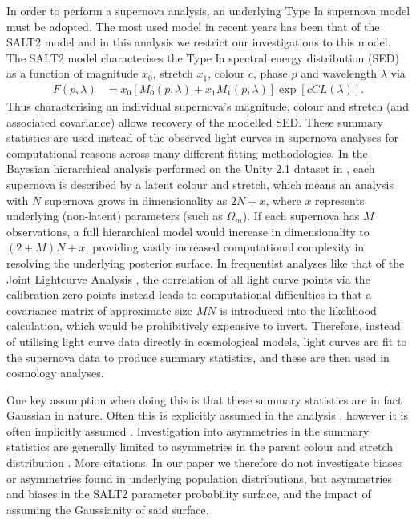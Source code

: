\documentclass[a4paper,fleqn,usenatbib]{mnras}
\newcommand{\red}{\color{red}}
\begin{document}
In order to perform a supernova analysis, an underlying Type Ia supernova model must be adopted. The most used model in recent years has been that of the SALT2 model \citep{GuyAstier2007, GuySullivan2010, MosherGuy2014} and in this analysis we restrict our investigations to this model. The SALT2 model characterises the Type Ia spectral energy distribution (SED) as a function of magnitude $x_0$, stretch $x_1$, colour $c$, phase $p$ and wavelength $\lambda$ via
\begin{align}
F(p,\lambda) &= x_0 \left[ M_0(p,\lambda) + x_1 M_1(p,\lambda)\right] \exp\left[c CL(\lambda)\right].
\end{align} 
Thus characterising an individual supernova's magnitude, colour and stretch (and associated covariance) allows recovery of the modelled SED. These summary statistics are used instead of the observed light curves in supernova analyses for computational reasons across many different fitting methodologies. In the Bayesian hierarchical analysis performed on the Unity 2.1 dataset \citep{SuzukiRubin2012} in \citet{RubinAldering2015}, each supernova is described by a latent colour and stretch, which means an analysis with $N$ supernova grows in dimensionality as $2N + x$, where $x$ represents underlying (non-latent) parameters (such as $\Omega_m$). If each supernova has $M$ observations, a full hierarchical model would increase in dimensionality to $(2+M)N + x$, providing vastly increased computational complexity in resolving the underlying posterior surface. In frequentist analyses like that of the Joint Lightcurve Analysis \citep{BetouleKessler2014}, the correlation of all light curve points via the calibration zero points instead leads to computational difficulties in that a covariance matrix of approximate size $MN$ is introduced into the likelihood calculation, which would be prohibitively expensive to invert. Therefore, instead of utilising light curve data directly in cosmological models, light curves are fit to the supernova data to produce summary statistics, and these are then used in cosmology analyses. 

One key assumption when doing this is that these summary statistics are in fact Gaussian in nature. Often this is explicitly assumed in the analysis \citep{MarchTrotta2011, RubinAldering2015}, however it is often implicitly assumed \citep{SullivanGuy2011, SuzukiRubin2012, CampbellDAndrea2013, BetouleKessler2014}. Investigation into asymmetries in the summary statistics are generally limited to asymmetries in the parent colour and stretch distribution \citep{ScolnicRest2014}. {\red More citations.} In our paper we therefore do not investigate biases or asymmetries found in underlying population distributions, but asymmetries and biases in the SALT2 parameter probability surface, and the impact of assuming the Gaussianity of said surface.
\end{document}
